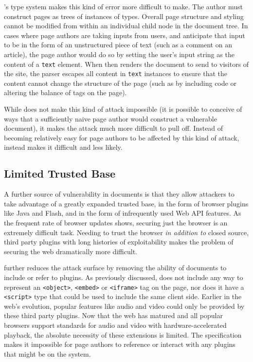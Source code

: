 \CDF's type system makes this kind of error more difficult to make.  The \CDF
author must construct pages as trees of instances of types.  Overall page
structure and styling cannot be modified from within an individual child node
in the document tree. In cases where page authors are taking inputs from users,
and anticipate that input to be in the form of an unstructured piece of text
(such as a comment on an article), the page author would do so by setting the
user's input string as the content of a \texttt{text} element.  When \CDF then
renders the document to send to visitors of the site, the \CDF parser escapes
all content in \texttt{text} instances to ensure that the content cannot change
the structure of the page (such as by including \JS code or altering the
balance of tags on the page).

While \CDF does not make this kind of attack impossible (it is possible to
conceive of ways that a sufficiently naive page author would construct a
vulnerable document), it makes the attack much more difficult to pull off.
Instead of becoming relatively easy for page authors to be affected by this
kind of attack, \CDF instead makes it difficult and less likely.


\subsection{Limited Trusted Base}
A further source of vulnerability in \HTML documents is that they allow
attackers to take advantage of a greatly expanded trusted base, in the form of
browser plugins like Java and Flash, and in the form of infrequently used Web
API features.  As the frequent rate of browser updates shows, securing just the
browser is an extremely difficult task.  Needing to trust the browser \emph{in
addition to} closed source, third party plugins with long histories of
exploitability makes the problem of securing the web dramatically more
difficult.

\CDF further reduces the attack surface by removing the ability of \CDF
documents to include or refer to plugins. As previously discussed, \CDF does
not include any way to represent an \texttt{<object>}, \texttt{<embed>} or
\texttt{<iframe>} tag on the page, nor does it have a \texttt{<script>} type
that could be used to include the same client side. Earlier in the web's
evolution, popular features like audio and video could only be provided by
these third party plugins. Now that the web has matured and all popular
browsers support standards for audio and video with hardware-accelerated
playback, the absolute necessity of these extensions is limited. The \CDF
specification makes it impossible for \CDF page authors to reference or
interact with any plugins that might be on the system.



